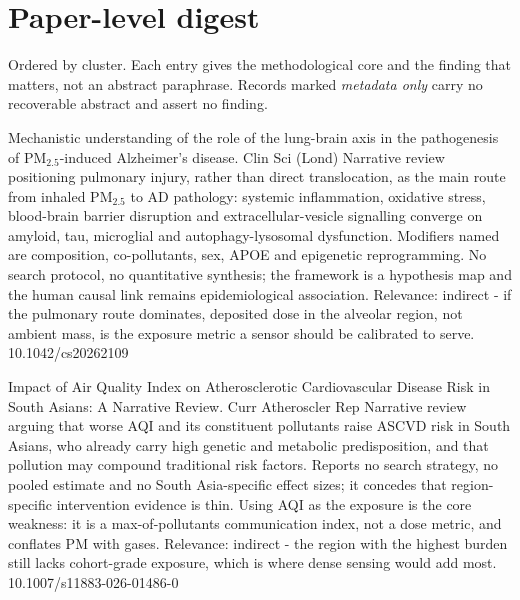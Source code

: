 \documentclass[10pt]{article}
\begin{document}
\vspace{4mm}

\par{}\baselineskip{}\baselineskip
\section*{\sffamily\bfseries\color{Deep}Paper-level digest}
\vspace{-1.5mm}{\color{Amber}\rule{\linewidth}{1.1pt}}\vspace{2.5mm}

{\fontsize{7.4}{9}\selectfont\color{Slate}Ordered by cluster. Each entry gives the
methodological core and the finding that matters, not an abstract paraphrase. Records
marked \textit{metadata only} carry no recoverable abstract and assert no finding.\par}


{Mechanistic understanding of the role of the lung-brain axis in the pathogenesis of PM$_{2.5}$-induced Alzheimer's disease.}
{Clin Sci (Lond)}
{Narrative review positioning pulmonary injury, rather than direct translocation, as the main route from inhaled PM$_{2.5}$ to AD pathology: systemic inflammation, oxidative stress, blood-brain barrier disruption and extracellular-vesicle signalling converge on amyloid, tau, microglial and autophagy-lysosomal dysfunction. Modifiers named are composition, co-pollutants, sex, APOE and epigenetic reprogramming. No search protocol, no quantitative synthesis; the framework is a hypothesis map and the human causal link remains epidemiological association. Relevance: indirect - if the pulmonary route dominates, deposited dose in the alveolar region, not ambient mass, is the exposure metric a sensor should be calibrated to serve.}
{10.1042/cs20262109}

\par{}\baselineskip{}\baselineskip
{}

{Impact of Air Quality Index on Atherosclerotic Cardiovascular Disease Risk in South Asians: A Narrative Review.}
{Curr Atheroscler Rep}
{Narrative review arguing that worse AQI and its constituent pollutants raise ASCVD risk in South Asians, who already carry high genetic and metabolic predisposition, and that pollution may compound traditional risk factors. Reports no search strategy, no pooled estimate and no South Asia-specific effect sizes; it concedes that region-specific intervention evidence is thin. Using AQI as the exposure is the core weakness: it is a max-of-pollutants communication index, not a dose metric, and conflates PM with gases. Relevance: indirect - the region with the highest burden still lacks cohort-grade exposure, which is where dense sensing would add most.}
{10.1007/s11883-026-01486-0}
\end{document}
